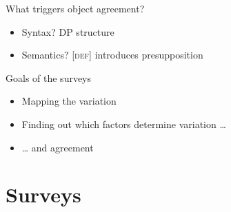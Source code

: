 \documentclass[12pt]{beamer}
\begin{document}
\begin{frame}{What triggers object agreement?}

        \begin{itemize}

            \item Syntax? DP structure\hfill\parencite{Bartos1999}
            \item Semantics? [\textsc{def}] introduces presupposition\hfill\parencite{Coppock2013P}

        \end{itemize}

    \begin{block}{Goals of the surveys}

        \begin{itemize}

            \item Mapping the variation

            \item Finding out which factors determine variation \dots

            \item \dots{} and agreement

        \end{itemize}

    \end{block}

\end{frame}

\section{Surveys}
\end{document}
